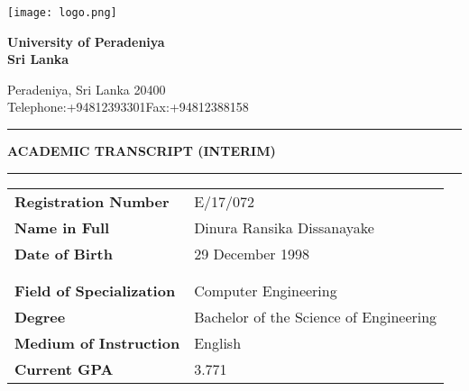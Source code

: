 \documentclass[12pt]{article}
\begin{document}
\noindent
\begin{minipage}[H]{0.17\linewidth}
\centering
\texttt{[image: logo.png]}
\end{minipage}%
\hfill
  \begin{minipage}[H]{0.8\linewidth}
{\fontsize{28}{30}\selectfont \textbf{University of Peradeniya\\Sri Lanka}}

\Large Peradeniya, Sri Lanka 20400\\
{\fontsize{12}{30}\selectfont Telephone:+94812393301\hfill Fax:+94812388158}


  \end{minipage}

\vspace{10pt}
\noindent\rule{\textwidth}{1pt}
\vspace{-15pt}
\begin{center}
{\fontsize{21}{30}\selectfont \textbf{ACADEMIC TRANSCRIPT (INTERIM)}}
\end{center}

\vspace{-12.5pt}

\noindent\rule{\textwidth}{1pt}

\begin{table}[H]
\begin{tabularx}{\textwidth}{Xl}
\textbf{Registration Number} & E/17/072 \\
\textbf{Name in Full} & Dinura Ransika Dissanayake \\
\textbf{Date of Birth} & 29 December 1998 \\
\\
\\

\textbf{Field of Specialization} & Computer Engineering \\
\textbf{Degree} & Bachelor of the Science of Engineering \\
\textbf{Medium of Instruction} & English \\
\textbf{Current GPA} & 3.771\\
\end{tabularx}
\end{table}

\vspace{-15pt}
\end{document}
